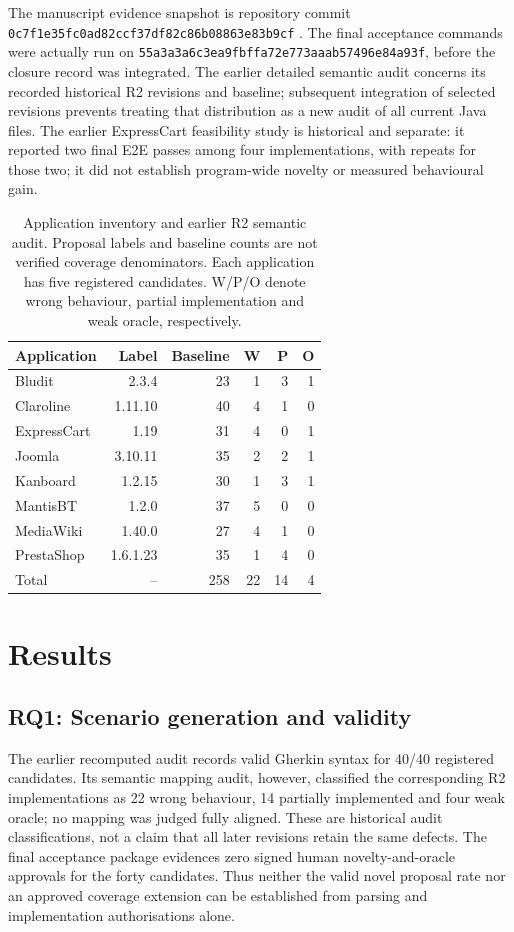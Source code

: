 \documentclass[pdflatex,sn-mathphys-num]{sn-jnl}
\begin{document}
The manuscript evidence snapshot is repository commit \nolinkurl{0c7f1e35fc0ad82ccf37df82c86b08863e83b9cf} \cite{covextartifact}. The final acceptance commands were actually run on \nolinkurl{55a3a3a6c3ea9fbffa72e773aaab57496e84a93f}, before the closure record was integrated. The earlier detailed semantic audit concerns its recorded historical R2 revisions and baseline; subsequent integration of selected revisions prevents treating that distribution as a new audit of all current Java files. The earlier ExpressCart feasibility study is historical and separate: it reported two final E2E passes among four implementations, with repeats for those two; it did not establish program-wide novelty or measured behavioural gain.
\begin{table}[htbp]\caption{Application inventory and earlier R2 semantic audit. Proposal labels and baseline counts are not verified coverage denominators. Each application has five registered candidates. W/P/O denote wrong behaviour, partial implementation and weak oracle, respectively.}\label{tab:apps}
\begin{tabular}{@{}lrrrrr@{}}\toprule
Application & Label & Baseline & W & P & O \\\midrule
Bludit & 2.3.4 & 23 & 1 & 3 & 1 \\
Claroline & 1.11.10 & 40 & 4 & 1 & 0 \\
ExpressCart & 1.19 & 31 & 4 & 0 & 1 \\
Joomla & 3.10.11 & 35 & 2 & 2 & 1 \\
Kanboard & 1.2.15 & 30 & 1 & 3 & 1 \\
MantisBT & 1.2.0 & 37 & 5 & 0 & 0 \\
MediaWiki & 1.40.0 & 27 & 4 & 1 & 0 \\
PrestaShop & 1.6.1.23 & 35 & 1 & 4 & 0 \\\midrule
Total & -- & 258 & 22 & 14 & 4 \\\bottomrule
\end{tabular}\end{table}

\section{Results}\label{sec:results}
\subsection{RQ1: Scenario generation and validity}
The earlier recomputed audit records valid Gherkin syntax for 40/40 registered candidates. Its semantic mapping audit, however, classified the corresponding R2 implementations as 22 wrong behaviour, 14 partially implemented and four weak oracle; no mapping was judged fully aligned. These are historical audit classifications, not a claim that all later revisions retain the same defects. The final acceptance package evidences zero signed human novelty-and-oracle approvals for the forty candidates. Thus neither the valid novel proposal rate nor an approved coverage extension can be established from parsing and implementation authorisations alone.
\end{document}
